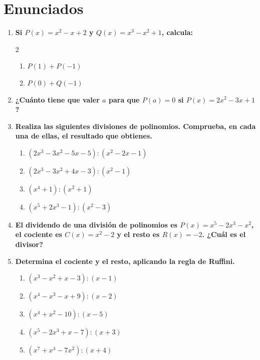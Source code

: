\documentclass[a4paper,12pt]{article}
\begin{document}
\section*{Enunciados}

\begin{enumerate}
    \item \textbf{Si $P(x) = x^2 - x + 2$ y $Q(x) = x^3 - x^2 + 1$, calcula:}
    \begin{multicols}{2}
    \begin{enumerate}[label=\textbf{\alph*)}]
        \item $P(1) + P(-1)$
        \item $P(0) + Q(-1)$
    \end{enumerate}
    \end{multicols}

    \item \textbf{¿Cuánto tiene que valer $a$ para que $P(a) = 0$ si $P(x) = 2x^2 - 3x + 1$?}

    \item \textbf{Realiza las siguientes divisiones de polinomios. Comprueba, en cada una de ellas, el resultado que obtienes.}
        \begin{enumerate}[label=\textbf{\alph*)}]
            \item $(2x^3 - 3x^2 - 5x - 5) : (x^2 - 2x - 1)$
            \item $(2x^3 - 3x^2 + 4x - 3) : (x^2 - 1)$
            \item $(x^4 + 1) : (x^2 + 1)$
            \item $(x^5 + 2x^3 - 1) : (x^2 - 3)$
        \end{enumerate}

    \item \textbf{El dividendo de una división de polinomios es $P(x) = x^5 - 2x^3 - x^2$, el cociente es $C(x) = x^2 - 2$ y el resto es $R(x) = -2$. ¿Cuál es el divisor?}

    \item \textbf{Determina el cociente y el resto, aplicando la regla de Ruffini.}
        \begin{enumerate}[label=\textbf{\alph*)}]
            \item $(x^3 - x^2 + x - 3) : (x - 1)$
            \item $(x^4 - x^3 - x + 9) : (x - 2)$
            \item $(x^4 + x^2 - 10) : (x - 5)$
            \item $(x^5 - 2x^3 + x - 7) : (x + 3)$
            \item $(x^7 + x^4 - 7x^2) : (x + 4)$
        \end{enumerate}


\end{enumerate}
\end{document}
